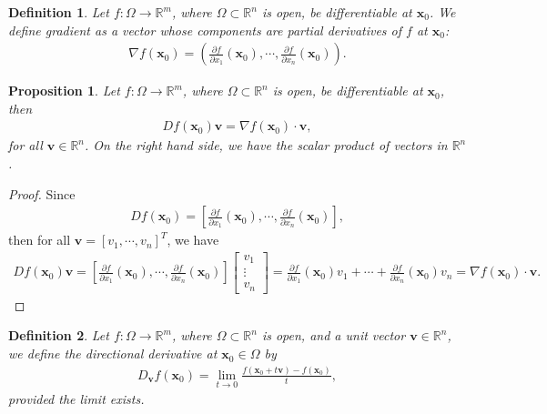 \documentclass[10pt]{book}
\newtheorem{definition}{Definition}[chapter]
\newtheorem{proposition}{Proposition}[chapter]
\theoremstyle{definition}
\numberwithin{equation}{chapter}
\begin{document}
\medskip

\begin{definition}
Let $f: \Omega \to \mathbb{R}^m$, where $\Omega \subset \mathbb{R}^n$ is open, be differentiable at $\mathbf{x}_0$. We define gradient as a vector whose components are partial derivatives of $f$ at $\mathbf{x}_0$:
\begin{align*}
    \nabla f(\mathbf{x}_0) = \left(\frac{\partial f}{\partial x_1}(\mathbf{x}_0), \cdots, \frac{\partial f}{\partial x_n}(\mathbf{x}_0)\right).
\end{align*}
\end{definition}

\medskip

\begin{proposition}
Let $f: \Omega \to \mathbb{R}^m$, where $\Omega \subset \mathbb{R}^n$ is open, be differentiable at $\mathbf{x}_0$, then
\begin{align*}
    Df(\mathbf{x}_0) \mathbf{v} = \nabla f(\mathbf{x}_0) \cdot \mathbf{v},
\end{align*}
for all $\mathbf{v} \in \mathbb{R}^n$. On the right hand side, we have the scalar product of vectors in $\mathbb{R}^n$.
\end{proposition}
\begin{proof}
Since
\begin{align*}
    Df(\mathbf{x}_0) = \left[\frac{\partial f}{\partial x_1}(\mathbf{x}_0), \cdots, \frac{\partial f}{\partial x_n}(\mathbf{x}_0)\right],
\end{align*}
then for all $\mathbf{v} = \left[v_1, \cdots, v_n\right]^T$, we have
\begin{align*}
    Df(\mathbf{x}_0) \mathbf{v} = \left[\frac{\partial f}{\partial x_1}(\mathbf{x}_0), \cdots, \frac{\partial f}{\partial x_n}(\mathbf{x}_0)\right] 
    \begin{bmatrix}
        v_1 \\
        \vdots \\
        v_n
    \end{bmatrix} = \frac{\partial f}{\partial x_1}(\mathbf{x}_0) v_1 + \cdots + \frac{\partial f}{\partial x_n}(\mathbf{x}_0) v_n = \nabla f(\mathbf{x}_0) \cdot \mathbf{v}.
\end{align*}
\end{proof}

\medskip

\begin{definition}
Let $f: \Omega \to \mathbb{R}^m$, where $\Omega \subset \mathbb{R}^n$ is open, and a unit vector $\mathbf{v} \in \mathbb{R}^n$, we define the directional derivative at $\mathbf{x}_0 \in \Omega$ by
\begin{align*}
    D_{\mathbf{v}} f(\mathbf{x}_0) = \lim_{t \to 0} \frac{f(\mathbf{x}_0 + t \mathbf{v}) - f(\mathbf{x}_0)}{t}, 
\end{align*}
provided the limit exists.
\end{definition}
\end{document}
